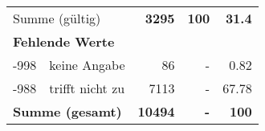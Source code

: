 \begin{longtable}{lXrrr}
     \midrule
     \multicolumn{2}{l}{Summe (gültig)} &
       \textbf{\num{3295}} &
     \textbf{\num{100}} &
       \textbf{\num[round-mode=places,round-precision=2]{31.4}} \\
     \multicolumn{5}{l}{\textbf{Fehlende Werte}}\\
       -998 &
       keine Angabe &
         \num{86} &
        - &
         \num[round-mode=places,round-precision=2]{0.82} \\
       -988 &
       trifft nicht zu &
         \num{7113} &
        - &
         \num[round-mode=places,round-precision=2]{67.78} \\
     \midrule
     \multicolumn{2}{l}{\textbf{Summe (gesamt)}} &
          \textbf{\num{10494}} &
        \textbf{-} &
        \textbf{\num{100}} \\
     \bottomrule
     \end{longtable}
     
